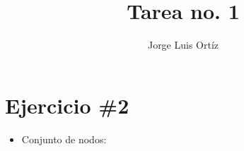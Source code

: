 \documentclass[]{article}
\title{Tarea no. 1}
\author{Jorge Luis Ortíz}
\begin{document}
\maketitle
\section{Ejercicio \#2}
\begin{itemize}
\item{Conjunto de nodos:} 

\end{itemize}

               
\end{document}
